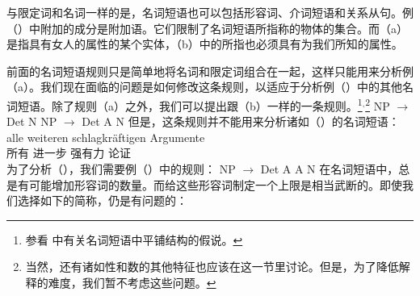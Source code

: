 \noindent
与限定词和名词一样的是，名词短语也可以包括形容词、介词短语和关系从句。例（）中附加的成分是附加语。它们限制了名词短语所指称的物体的集合。而（a）是指具有女人的属性的某个实体，（b）中的所指也必须具有为我们所知的属性。

前面的名词短语规则只是简单地将名词和限定词组合在一起，这样只能用来分析例（a）。我们现在面临的问题是如何修改这条规则，以适应于分析例（）中的其他名词短语。除了规则（a）之外，我们可以提出跟（b）一样的一条规则。\footnote{%
参看 中有关名词短语中平铺结构的假说。
}$^,$\footnote{%
当然，还有诸如性和数的其他特征也应该在这一节里讨论。但是，为了降低解释的难度，我们暂不考虑这些问题。
}
\eal
\ex NP $\to$ Det N
\ex NP $\to$ Det A N
\zl
但是，这条规则并不能用来分析诸如（）的名词短语：
\ea
\label{Beispiel-alle-weitern-schlagkraeftigen-Argumente}
\gll alle weiteren schlagkräftigen Argumente\\
	 所有 进一步 强有力 论证\\
\z
为了分析（），我们需要例（）中的规则：
\ea 
NP $\to$ Det A A N
\z
在名词短语中，总是有可能增加形容词的数量。而给这些形容词制定一个上限是相当武断的。即使我们选择如下的简称，仍是有问题的：

